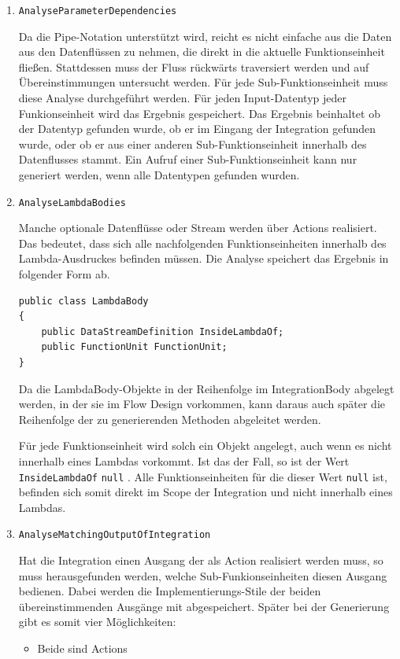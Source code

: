 	\begin{enumerate}
		\item \texttt{AnalyseParameterDependencies}

		Da die Pipe-Notation unterstützt wird, reicht es nicht einfache aus die Daten
		aus den Datenflüssen zu nehmen, die direkt in die aktuelle
		Funktionseinheit fließen. Stattdessen muss der Fluss rückwärts
		traversiert werden und auf Übereinstimmungen untersucht werden.
		Für jede Sub-Funktionseinheit muss diese Analyse durchgeführt werden.
		Für jeden Input-Datentyp jeder Funkionseinheit wird das Ergebnis gespeichert.
		Das Ergebnis beinhaltet ob der Datentyp gefunden
		wurde, ob er im Eingang der Integration gefunden wurde, oder ob er aus einer
		anderen Sub-Funktionseinheit innerhalb des Datenflusses stammt. 
		Ein Aufruf einer Sub-Funktionseinheit kann nur generiert werden, wenn alle Datentypen gefunden
		wurden.
		
		\item \texttt{AnalyseLambdaBodies}

		Manche optionale Datenflüsse oder Stream werden über Actions realisiert.
		Das bedeutet, dass sich alle nachfolgenden Funktionseinheiten innerhalb
		des Lambda-Ausdruckes befinden müssen. Die Analyse speichert das Ergebnis
		in folgender Form ab. 
		
		\begin{lstlisting}[caption=LambdaBody Klasse]
public class LambdaBody
{
	public DataStreamDefinition InsideLambdaOf;
	public FunctionUnit FunctionUnit;
}
		\end{lstlisting}
		
		Da die LambdaBody-Objekte in der Reihenfolge im IntegrationBody abgelegt
		werden, in der sie im Flow Design vorkommen, kann daraus auch später die
		Reihenfolge der zu generierenden Methoden abgeleitet werden.
		
		
		Für jede Funktionseinheit wird solch ein Objekt angelegt, auch wenn es
		nicht innerhalb eines Lambdas vorkommt. Ist das der Fall, so ist der Wert
		\texttt{InsideLambdaOf} \texttt{null} . Alle Funktionseinheiten für die dieser Wert
		\texttt{null} ist, befinden sich somit direkt im Scope der Integration und nicht
		innerhalb eines Lambdas.
		
		\item \texttt{AnalyseMatchingOutputOfIntegration}

		Hat die Integration einen Ausgang der als Action realisiert werden muss, so
		muss herausgefunden werden, welche Sub-Funkionseinheiten diesen
		Ausgang bedienen. Dabei werden die Implementierungs-Stile der
		beiden übereinstimmenden Ausgänge mit abgespeichert. Später bei der
		Generierung gibt es somit vier Möglichkeiten:
		\begin{itemize}
			\item Beide sind Actions
			

\end{itemize}
\end{enumerate}
